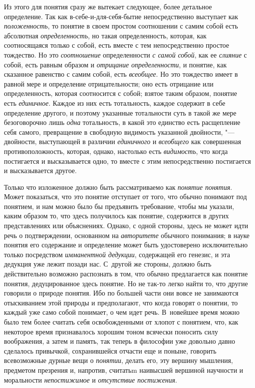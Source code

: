 Из этого для понятия сразу же вытекает следующее, более детальное
определение. Так как в-себе-и-для-себя-бытие непосредственно выступает как
{\em положенность}, то понятие в своем простом соотношении с самим собой есть
абсолютная {\em определенность}, но такая определенность, которая, как
соотносящаяся только с собой, есть вместе с тем непосредственно простое
тождество. Но это {\em соотношение} определенности {\em с самой собой}, как
ее {\em слияние} с собой, есть равным образом и {\em отрицание определенности},
и понятие, как сказанное равенство с самим собой, есть {\em всеобщее}.
Но это тождество имеет в равной мере и определение отрицательности; оно есть
отрицание или определенность, которая соотносится с собой; взятое таким
образом, понятие есть {\em единичное}. Каждое из них есть тотальность, каждое
содержит в себе определение другого, и поэтому указанные тотальности суть в
такой же мере безоговорочно лишь {\em одна} тотальность, в какой это
единство есть расщепление себя самого, превращение в свободную видимость
указанной двойности, "--- двойности, выступающей в различии {\em единичного}
и {\em всеобщего} как совершенная противоположность, которая, однако, настолько
есть {\em видимость}, что когда постигается и высказывается одно, то вместе
с этим непосредственно постигается и высказывается другое.

Только что изложенное должно быть рассматриваемо как {\em понятие понятия}.
Может показаться, что это понятие отступает от того, что обычно понимают под
понятием, и нам можно было бы предъявить требование, чтобы мы указали, каким
образом то, что здесь получилось как понятие, содержится в других
представлениях или объяснениях. Однако, с одной стороны, здесь не может идти
речь о подтверждении, основанном на {\em авторитете} обычного понимания; в
науке понятия его содержание и определение может быть удостоверено
исключительно только посредством {\em имманентной дедукции}, содержащей его
генезис, и эта дедукция уже лежит позади нас. С~другой же стороны, должно
быть действительно возможно распознать в том, что обычно предлагается как
понятие понятия, дедуцированное здесь понятие. Но не так-то легко найти то,
что другие говорили о природе понятия. Ибо по большей части они вовсе не
занимаются отыскиванием этой природы и предполагают, что когда говорят о
понятии, то каждый уже само собой понимает, о чем идет речь. В~новейшее
время можно было тем более считать себя освобожденными от хлопот с понятием,
что, как некоторое время признавалось хорошим тоном всячески поносить силу
воображения, а затем и память, так теперь в философии уже довольно давно
сделалось привычкой, сохранившейся отчасти еще и поныне, говорить
всевозможные дурные вещи о {\em понятии}, делать его, эту вершину мышления,
предметом презрения и, напротив, считатьm наивысшей вершиной научности и
моральности {\em непостижимое} и {\em отсутствие постижения}.

